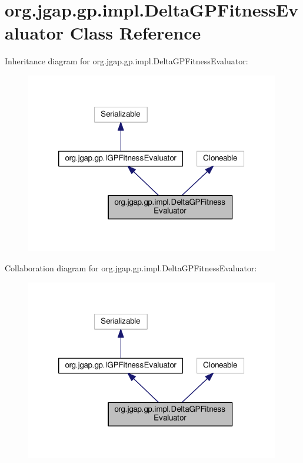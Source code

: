 \hypertarget{classorg_1_1jgap_1_1gp_1_1impl_1_1_delta_g_p_fitness_evaluator}{\section{org.\-jgap.\-gp.\-impl.\-Delta\-G\-P\-Fitness\-Evaluator Class Reference}
\label{classorg_1_1jgap_1_1gp_1_1impl_1_1_delta_g_p_fitness_evaluator}
}


Inheritance diagram for org.\-jgap.\-gp.\-impl.\-Delta\-G\-P\-Fitness\-Evaluator\-:
\nopagebreak
\begin{figure}[H]
\begin{center}
\leavevmode
\includegraphics[width=314pt]{classorg_1_1jgap_1_1gp_1_1impl_1_1_delta_g_p_fitness_evaluator__inherit__graph}
\end{center}
\end{figure}


Collaboration diagram for org.\-jgap.\-gp.\-impl.\-Delta\-G\-P\-Fitness\-Evaluator\-:
\nopagebreak
\begin{figure}[H]
\begin{center}
\leavevmode
\includegraphics[width=314pt]{classorg_1_1jgap_1_1gp_1_1impl_1_1_delta_g_p_fitness_evaluator__coll__graph}
\end{center}
\end{figure}
